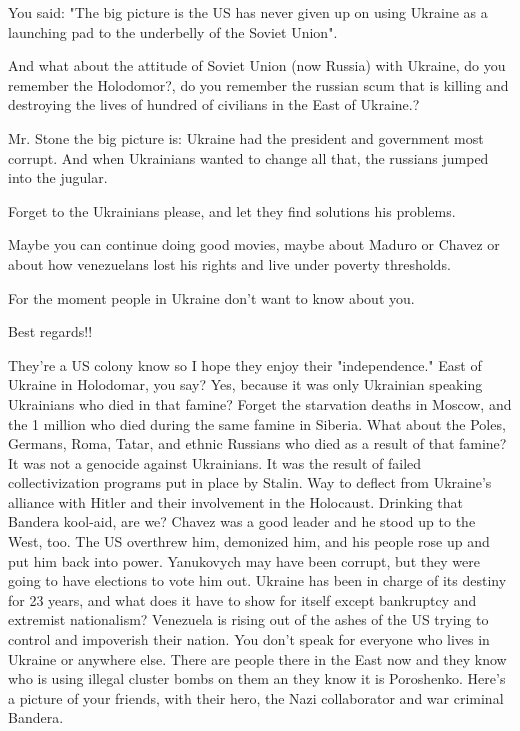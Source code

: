 \begin{itemize}
You said: "The big picture is the US has never given up on using Ukraine as a
launching pad to the underbelly of the Soviet Union".

And what about the attitude of Soviet Union (now Russia) with Ukraine, do you
remember the Holodomor?, do you remember the russian scum that is killing and
destroying the lives of hundred of civilians in the East of Ukraine.?

Mr. Stone the big picture is: Ukraine had the president and government most
corrupt. And when Ukrainians wanted to change all that, the russians jumped
into the jugular.

Forget to the Ukrainians please, and let they find solutions his problems.

Maybe you can continue doing good movies, maybe about Maduro or Chavez or about
how venezuelans lost his rights and live under poverty thresholds.

For the moment people in Ukraine don't want to know about you.

Best regards!!

\begin{itemize} %

They're a US colony know so I hope they enjoy their "independence." East of
Ukraine in Holodomar, you say? Yes, because it was only Ukrainian speaking
Ukrainians who died in that famine? Forget the starvation deaths in Moscow, and
the 1 million who died during the same famine in Siberia. What about the Poles,
Germans, Roma, Tatar, and ethnic Russians who died as a result of that famine?
It was not a genocide against Ukrainians. It was the result of failed
collectivization programs put in place by Stalin. Way to deflect from Ukraine's
alliance with Hitler and their involvement in the Holocaust. Drinking that
Bandera kool-aid, are we? Chavez was a good leader and he stood up to the West,
too. The US overthrew him, demonized him, and his people rose up and put him
back into power. Yanukovych may have been corrupt, but they were going to have
elections to vote him out. Ukraine has been in charge of its destiny for 23
years, and what does it have to show for itself except bankruptcy and extremist
nationalism? Venezuela is rising out of the ashes of the US trying to control
and impoverish their nation. You don't speak for everyone who lives in Ukraine
or anywhere else. There are people there in the East now and they know who is
using illegal cluster bombs on them an they know it is Poroshenko. Here's a
picture of your friends, with their hero, the Nazi collaborator and war
criminal Bandera.


\end{itemize}
\end{itemize}
